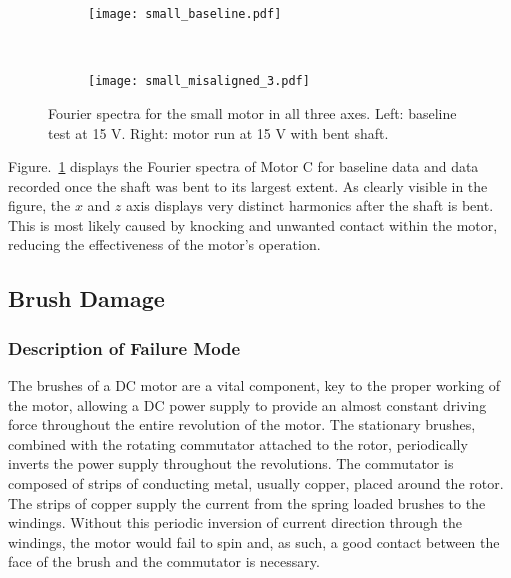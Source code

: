 \begin{figure}[t!]
    \centering
    \begin{subfigure}[t]{0.5\textwidth}
        \centering
        \texttt{[image: small\_baseline.pdf]}
    \end{subfigure}%
    ~ 
    \begin{subfigure}[t]{0.5\textwidth}
        \centering
        \texttt{[image: small\_misaligned\_3.pdf]}
    \end{subfigure}
    \caption[Fourier Plot Misaligned Shaft]{Fourier spectra for the small motor in all three axes. Left: baseline test at 15 V. Right: motor run at 15 V with bent shaft.}
    \label{fig:bent_shaft_fourier}
\end{figure}

Figure.~\ref{fig:bent_shaft_fourier} displays the Fourier spectra of Motor C for baseline data and data recorded once the shaft was bent to its largest extent. As clearly visible in the figure, the $x$ and $z$ axis displays very distinct harmonics after the shaft is bent. This is most likely caused by knocking and unwanted contact within the motor, reducing the effectiveness of the motor's operation.


\subsection{Brush Damage}

\subsubsection{Description of Failure Mode}
The brushes of a DC motor are a vital component, key to the proper working of the motor, allowing a DC power supply to provide an almost constant driving force throughout the entire revolution of the motor. The stationary brushes, combined with the rotating commutator attached to the rotor, periodically inverts the power supply throughout the revolutions. The commutator is composed of strips of conducting metal, usually copper, placed around the rotor. The strips of copper supply the current from the spring loaded brushes to the windings.  Without this periodic inversion of current direction through the windings, the motor would fail to spin and, as such, a good contact between the face of the brush and the commutator is necessary. 

